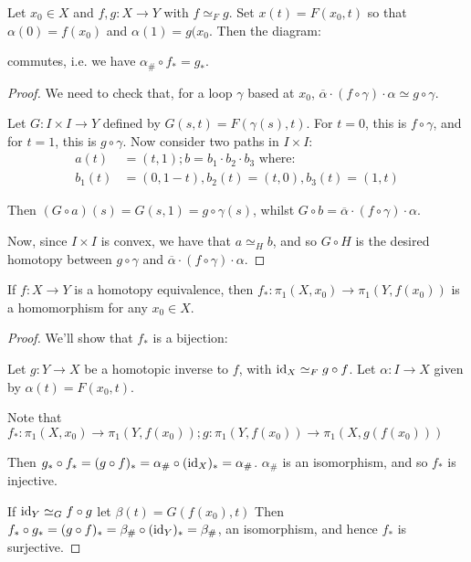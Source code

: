 \documentclass[10pt,a4paper]{article}
\begin{document}
\begin{lemma}
Let $x_0 \in X$ and $f, g:X\rightarrow Y$ with $f\simeq_F g$. Set $x(t) = F(x_0, t)$ so that $\alpha(0)=f(x_0)$ and $\alpha(1) = g(x_0$. Then the diagram:
\begin{center}
\end{center}
commutes, i.e. we have $\alpha_\# \circ f_\ast = g_\ast$.
\end{lemma}
\begin{proof}
We need to check that, for a loop $\gamma$ based at $x_0$, $\overline{\alpha}\cdot(f\circ \gamma) \cdot \alpha \simeq g\circ\gamma$.

Let $G:I\times I\rightarrow Y$ defined by $G(s,t) = F(\gamma(s), t)$. For $t=0$, this is $f\circ \gamma$, and for $t=1$, this is $g\circ \gamma$. Now consider two paths in $I\times I$: 
\begin{align*}
a(t) &= (t,1); b = b_1 \cdot b_2 \cdot b_3\text{ where:}\\
b_1(t) &= (0,1-t), b_2(t)=(t,0), b_3(t)=(1,t)
\end{align*}

Then $(G\circ a)(s) = G(s,1) = g\circ \gamma(s)$, whilst $G \circ b = \overline{\alpha} \cdot (f\circ \gamma)\cdot \alpha$.

Now, since $I\times I$ is convex, we have that $a\simeq_H b$, and so $G\circ H$ is the desired homotopy between $g\circ \gamma$ and $\overline{\alpha}\cdot (f\circ \gamma) \cdot \alpha$.
\end{proof}

\begin{theorem}
If $f:X\rightarrow Y$ is a homotopy equivalence, then $f_\ast : \pi_1(X, x_0) \rightarrow \pi_1(Y, f(x_0))$ is a homomorphism for any $x_0 \in X$.
\end{theorem}
\begin{proof}
We'll show that $f_\ast$ is a bijection:

Let $g:Y\rightarrow X$ be a homotopic inverse to $f$, with $\operatorname{id}_X\simeq_F g\circ f$. Let $\alpha:I\rightarrow X$ given by $\alpha(t)=F(x_0, t)$.

Note that $f_\ast:\pi_1(X, x_0) \rightarrow \pi_1(Y, f(x_0)); g:\pi_1(Y, f(x_0))\rightarrow \pi_1(X, g(f(x_0)))$

Then $g_\ast\circ f_\ast = (g\circ f)_\ast = \alpha_\#\circ (\operatorname{id}_X)_\ast = \alpha_\#$. $\alpha_\#$ is an isomorphism, and so $f_\ast$ is injective.

If $\operatorname{id}_Y \simeq_G f\circ g$ let $\beta(t) = G(f(x_0), t)$ Then $f_\ast\circ g_\ast = (g\circ f)_\ast = \beta_\#\circ (\operatorname{id}_Y)_\ast = \beta_\#$, an isomorphism, and hence $f_\ast$ is surjective.
\end{proof}
\end{document}
